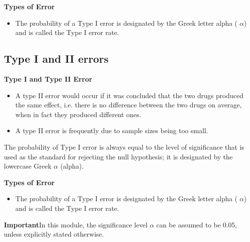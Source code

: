 
\textbf{Types of Error}
\begin{itemize}
\item The probability of a Type I error is designated by the Greek letter alpha ( $\alpha$) and is called the Type I error rate. 

\end{itemize}






\subsection{Type I and II errors}






\textbf{Type I and Type II Error}
\begin{itemize}

\item A type II error would occur if it was concluded that the two drugs produced the same effect, i.e. there is no difference between the two drugs on average, when in fact they produced different ones.
\item A type II error is frequently due to sample sizes being too small.
\end{itemize}



The probability of Type I error is always equal to the level of significance that is used as the standard for rejecting
the null hypothesis; it is designated by the lowercase Greek $\alpha$ (alpha).





\textbf{Types of Error}
\begin{itemize}
\item The probability of a Type I error is designated by the Greek letter alpha ( $\alpha$) and is called the Type I error rate.

\end{itemize}




\begin{framed}
\noindent \textbf{Important}In this module, the significance level $\alpha$ can be assumed to be 0.05, unless explicitly stated otherwise.
\end{framed}





